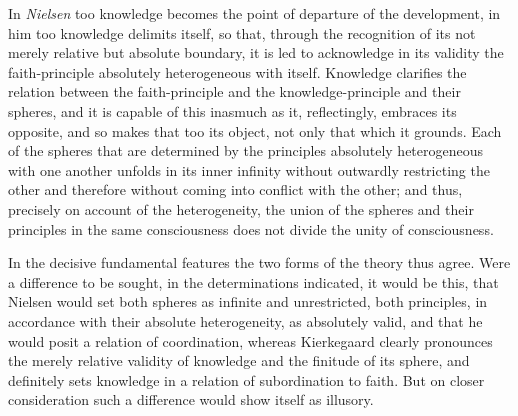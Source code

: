 \documentclass[12pt,a4paper]{book}
\begin{document}
In \emph{Nielsen} too knowledge becomes the point of departure of the development, in
him too knowledge delimits itself, so that, through the recognition of its not
merely relative but absolute boundary, it is led to acknowledge in its
validity the faith-principle absolutely heterogeneous with itself. Knowledge
clarifies the relation between the faith-principle and the knowledge-principle
and their spheres, and it is capable of this inasmuch as it, reflectingly,
embraces its opposite, and so makes that too its object, not only that which it
grounds. Each of the spheres that are determined by the principles absolutely
heterogeneous with one another unfolds in its inner infinity without outwardly
restricting the other and therefore without coming into conflict with the
other; and thus, precisely on account of the heterogeneity, the union of the
spheres and their principles in the same consciousness does not divide the
unity of consciousness.

In the decisive fundamental features the two forms of the theory thus agree.
Were a difference to be sought, in the determinations indicated, it would be
this, that Nielsen would set both spheres as infinite and unrestricted, both
principles, in accordance with their absolute heterogeneity, as absolutely
valid, and that he would posit a relation of coordination, whereas Kierkegaard
clearly pronounces the merely relative validity of knowledge and the finitude
of its sphere, and definitely sets knowledge in a relation of subordination to
faith. But on closer consideration such a difference would show itself as
illusory.
\end{document}
